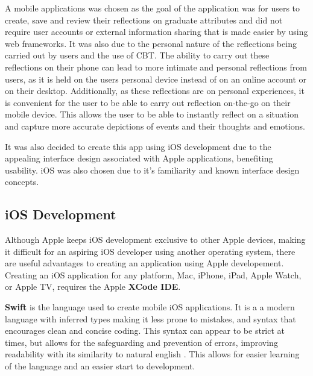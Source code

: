 \documentclass{l4proj}
\begin{document}
A mobile applications was chosen as the goal of the application was for users to create, save and review their reflections on graduate attributes and did not require user accounts or external information sharing that is made easier by using web frameworks. It was also due to the personal nature of the reflections being carried out by users and the use of CBT. The ability to carry out these reflections on their phone can lead to more intimate and personal reflections from users, as it is held on the users personal device instead of on an online account or on their desktop. Additionally, as these reflections are on personal experiences, it is convenient for the user to be able to carry out reflection on-the-go on their mobile device. This allows the user to be able to instantly reflect on a situation and capture more accurate depictions of events and their thoughts and emotions. 

It was also decided to create this app using iOS development due to the appealing interface design associated with Apple applications, benefiting usability. iOS was also chosen due to it's familiarity and known interface design concepts.

\subsection{iOS Development}

Although Apple keeps iOS development exclusive to other Apple devices, making it difficult for an aspiring iOS developer using another operating system, there are useful advantages to creating an application using Apple developement. Creating an iOS application for any platform, Mac, iPhone, iPad, Apple Watch, or Apple TV, requires the Apple \textbf{XCode IDE}. 

\textbf{Swift} is the language used to create mobile iOS applications. It is a a modern language with inferred types making it less prone to mistakes, and syntax that encourages clean and concise coding. This syntax can appear to be strict at times, but allows for the safeguarding and prevention of errors, improving readability with its similarity to natural english \citep{altexsoft_swift_2021}. This allows for easier learning of the language and an easier start to development.
\end{document}
